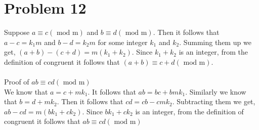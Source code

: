 \documentclass{article}
\begin{document}
\section{Problem 12}
Suppose $a \equiv c (\text{ mod m})$ and $b \equiv d (\text{ mod m})$. Then it follows
that $a - c = k_1m$ and $b - d = k_2m$ for some integer $k_1$ and
$k_2$. Summing them up we get, $(a + b) - (c + d) = m(k_1 + k_2)$.
Since $k_1 + k_2$ is an integer, from the definition of congruent it
follows that $(a + b) \equiv c + d (\text{ mod m})$. \\ \\
Proof of $ab \equiv cd (\text{ mod m})$ \\
We know that $ a = c + mk_1$. It follows that $ab = bc + bmk_1$.
Similarly we know that $b = d + mk_2$. Then it follows that $cd = cb -
cmk_2$. Subtracting them we get, $ab - cd = m(bk_1 + ck_2)$. Since
$bk_1 + ck_2$ is an integer, from the definition of congruent it
follows that $ab \equiv cd (\text{ mod m})$
\end{document}
